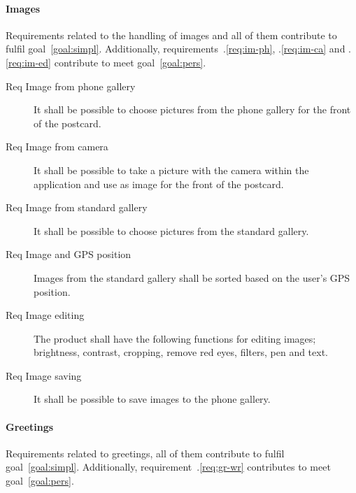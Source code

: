 \documentclass[10pt,a4paper]{article}
\begin{document}
\paragraph{Images} 
Requirements related to the handling of images and all of them contribute to fulfil goal~\ref{goal:simpl}. Additionally, requirements~\thesubsubsection .\ref{req:im-ph}, \thesubsubsection .\ref{req:im-ca} and \thesubsubsection .\ref{req:im-ed} contribute to meet goal~\ref{goal:pers}.	


\begin {description}
\item [Req \thesubsubsection {}  Image from phone gallery] It shall be possible to choose pictures from the phone gallery for the front of the postcard. 

\item [Req \thesubsubsection {} Image from camera] It shall be possible to take a picture with the camera within the application and use as image for the front of the postcard. 

\item [Req \thesubsubsection {} Image from standard gallery] It shall be possible to choose pictures from the standard gallery.

\item [Req \thesubsubsection {} Image and GPS position] Images from the standard gallery shall be sorted based on the user's GPS position.

\item [Req \thesubsubsection {} Image editing] The product shall have the following functions for editing images; brightness, contrast, cropping, remove red eyes, filters, pen and text.

\item [Req \thesubsubsection {} Image saving] It shall be possible to save images to the phone gallery.
\end{description}

\paragraph{Greetings}
Requirements related to greetings, all of them contribute to fulfil goal~\ref{goal:simpl}. Additionally, requirement~\thesubsubsection .\ref{req:gr-wr} contributes to meet goal~\ref{goal:pers}.
\end{document}
